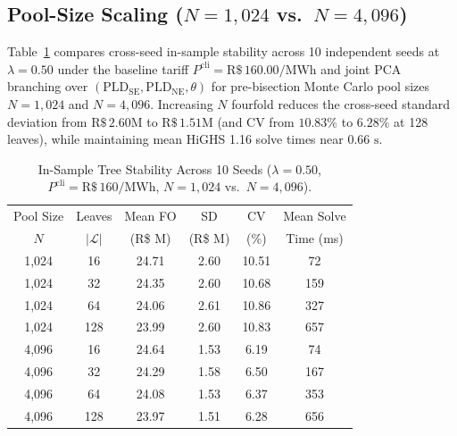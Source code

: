 \documentclass[10pt,journal]{IEEEtran}
\begin{document}
\subsection{Pool-Size Scaling ($N = 1,024$ vs.\ $N = 4,096$)}
Table~\ref{tab:supp_pool_scaling} compares cross-seed in-sample stability across 10 independent seeds at $\lambda = 0.50$ under the baseline tariff $P^{\text{cli}} = \text{R\$}\,160.00/\text{MWh}$ and joint PCA branching over $(\text{PLD}_{\text{SE}}, \text{PLD}_{\text{NE}}, \theta)$ for pre-bisection Monte Carlo pool sizes $N = 1,024$ and $N = 4,096$. Increasing $N$ fourfold reduces the cross-seed standard deviation from $\text{R\$}\,2.60\text{M}$ to $\text{R\$}\,1.51\text{M}$ (and CV from $10.83\%$ to $6.28\%$ at 128 leaves), while maintaining mean HiGHS 1.16 solve times near $0.66\text{ s}$.

\begin{table}[htbp]
\centering
\caption{In-Sample Tree Stability Across 10 Seeds ($\lambda = 0.50$, $P^{\text{cli}} = \text{R\$}\,160/\text{MWh}$, $N = 1,024$ vs.\ $N = 4,096$).}
\label{tab:supp_pool_scaling}
\scriptsize
\setlength{\tabcolsep}{3.0pt}
\begin{tabular}{cccccc}
\toprule
Pool Size & Leaves & Mean FO & SD & CV & Mean Solve \\
$N$ & $|\mathcal{L}|$ & (R\$ M) & (R\$ M) & (\%) & Time (ms) \\
\midrule
1,024 & 16  & 24.71 & 2.60 & 10.51 & 72  \\
1,024 & 32  & 24.35 & 2.60 & 10.68 & 159 \\
1,024 & 64  & 24.06 & 2.61 & 10.86 & 327 \\
1,024 & 128 & 23.99 & 2.60 & 10.83 & 657 \\
\midrule
4,096 & 16  & 24.64 & 1.53 & 6.19 & 74  \\
4,096 & 32  & 24.29 & 1.58 & 6.50 & 167 \\
4,096 & 64  & 24.08 & 1.53 & 6.37 & 353 \\
4,096 & 128 & 23.97 & 1.51 & 6.28 & 656 \\
\bottomrule
\end{tabular}
\end{table}
\end{document}
